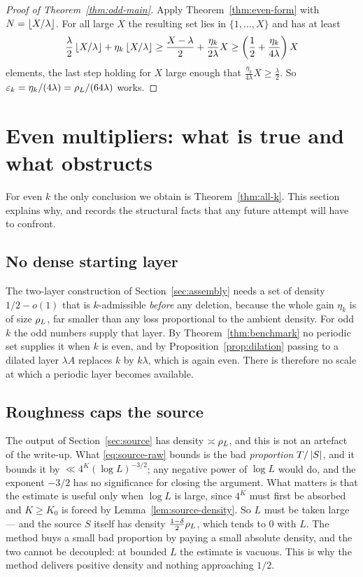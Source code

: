 \documentclass[11pt]{article}
\begin{document}
\begin{proof}[Proof of Theorem~\ref{thm:odd-main}]
Apply Theorem~\ref{thm:even-form} with \(N=\left\lfloor X/\lambda\right\rfloor\). For all large
\(X\) the resulting set lies in \(\{1,\ldots,X\}\) and has at least
\[
 \frac{\lambda}{2}\left\lfloor X/\lambda\right\rfloor+\eta_k\left\lfloor X/\lambda\right\rfloor
 \geq\frac{X-\lambda}{2}+\frac{\eta_k}{2\lambda}X
 \geq\left(\frac12+\frac{\eta_k}{4\lambda}\right)X
\]
elements, the last step holding for \(X\) large enough that
\(\frac{\eta_k}{4\lambda}X\geq\frac\lambda2\). So
\(\varepsilon_k=\eta_k/(4\lambda)=\rho_L/(64\lambda)\) works.
\end{proof}

\section{Even multipliers: what is true and what obstructs}\label{sec:even}

For even \(k\) the only conclusion we obtain is Theorem~\ref{thm:all-k}. This
section explains why, and records the structural facts that any future
attempt will have to confront.

\subsection{No dense starting layer}

The two-layer construction of Section~\ref{sec:assembly} needs a set of density
\(1/2-o(1)\) that is \(k\)-admissible \emph{before} any deletion, because the
whole gain \(\eta_k\) is of size \(\rho_L\), far smaller than any loss
proportional to the ambient density. For odd \(k\) the odd numbers supply
that layer. By Theorem~\ref{thm:benchmark} no periodic set supplies it when \(k\) is
even, and by Proposition~\ref{prop:dilation} passing to a dilated layer \(\lambda A\)
replaces \(k\) by \(k\lambda\), which is again even. There is therefore no
scale at which a periodic layer becomes available.

\subsection{Roughness caps the source}

The output of Section~\ref{sec:source} has density \(\asymp\rho_L\), and this
is not an artefact of the write-up. What \eqref{eq:source-raw} bounds is the
bad \emph{proportion} \(T/\left|S\right|\), and it bounds it by
\(\ll4^K(\log L)^{-3/2}\); any negative power of \(\log L\) would do, and the
exponent \(-3/2\) has no significance for closing the argument. What matters
is that the estimate is useful only when \(\log L\) is large, since \(4^K\)
must first be absorbed and \(K\geq K_0\) is forced by
Lemma~\ref{lem:source-density}. So \(L\) must be taken large --- and the
source \(S\) itself has density \(\frac{1-\delta}{2}\rho_L\), which tends to
\(0\) with \(L\). The method buys a small bad proportion by paying a small
absolute density, and the two cannot be decoupled: at bounded \(L\) the
estimate is vacuous. This is why the method delivers positive density and
nothing approaching \(1/2\).
\end{document}
